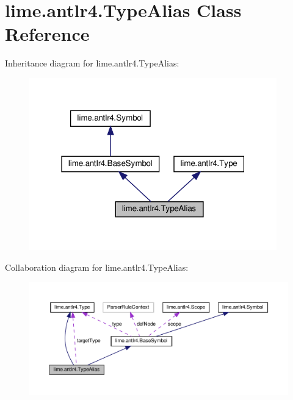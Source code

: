 \hypertarget{classlime_1_1antlr4_1_1TypeAlias}{}\section{lime.\+antlr4.\+Type\+Alias Class Reference}
\label{classlime_1_1antlr4_1_1TypeAlias}


Inheritance diagram for lime.\+antlr4.\+Type\+Alias\+:
\nopagebreak
\begin{figure}[H]
\begin{center}
\leavevmode
\includegraphics[width=304pt]{classlime_1_1antlr4_1_1TypeAlias__inherit__graph}
\end{center}
\end{figure}


Collaboration diagram for lime.\+antlr4.\+Type\+Alias\+:
\nopagebreak
\begin{figure}[H]
\begin{center}
\leavevmode
\includegraphics[width=350pt]{classlime_1_1antlr4_1_1TypeAlias__coll__graph}
\end{center}
\end{figure}
